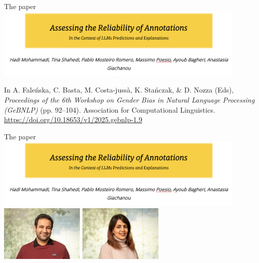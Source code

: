 \documentclass[t,xcolor={dvipsnames},final,aspectratio=169]{beamer}
\begin{document}
\begin{frame}{The paper}
\includegraphics[width=0.9\textwidth]{img/credit.png}

In A. Fale\'nska, C. Basta, M. Costa-juss\`a, K. Sta\'nczak, \& D. Nozza (Eds), \textit{Proceedings of the 6th Workshop on Gender Bias in Natural Language Processing (GeBNLP)} (pp. 92–104). Association for Computational Linguistics. \url{https://doi.org/10.18653/v1/2025.gebnlp-1.9}
\end{frame}

{
\begin{frame}{The paper}
\includegraphics[width=0.9\textwidth]{img/credit.png}
\includegraphics[width=0.3\textwidth]{img/hadi.jpg}
\includegraphics[width=0.3\textwidth]{img/tina.jpg}
\end{frame}
}
\end{document}
